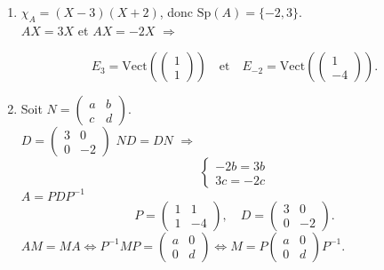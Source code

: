 \documentclass[a4paper,12pt,oneside]{book}
\newenvironment{solution}{\begin{solutionbox}}{\end{solutionbox}}
\begin{document}
	\begin{solution}
		\begin{enumerate}
			\item \( \chi_A = (X - 3)(X + 2) \), donc \( \text{Sp}(A) = \{-2, 3\} \).\\
			\( AX = 3X \) et \( AX = -2X \) $\Rightarrow$ 
			
			\[
			E_3 = \mathrm{Vect}\left( \begin{pmatrix} 1 \\ 1 \end{pmatrix} \right)
			\quad \text{et} \quad
			E_{-2} = \mathrm{Vect}\left( \begin{pmatrix} 1 \\ -4 \end{pmatrix} \right).
			\]
			
			\item Soit \( N = \begin{pmatrix} a & b \\ c & d \end{pmatrix} \).\\
			\( D = \begin{pmatrix} 3 & 0 \\ 0 & -2 \end{pmatrix} \)
			\( ND = DN \) $\Rightarrow$ \\
			\[
			\begin{cases}
				-2b = 3b \\
				3c = -2c
			\end{cases}
			\]
			\( A = PDP^{-1} \)
			\[
			P = \begin{pmatrix} 1 & 1 \\ 1 & -4 \end{pmatrix}, \quad D = \begin{pmatrix} 3 & 0 \\ 0 & -2 \end{pmatrix}.
			\]
			\( AM = MA \iff P^{-1}MP = \begin{pmatrix} a & 0 \\ 0 & d \end{pmatrix} \iff M = P \begin{pmatrix} a & 0 \\ 0 & d \end{pmatrix} P^{-1} \).
		\end{enumerate}
	\end{solution}
\end{document}
